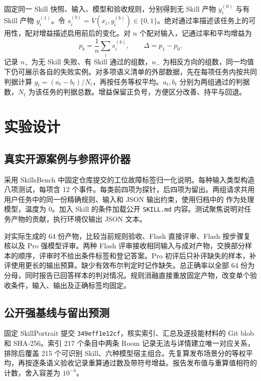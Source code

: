 \documentclass[final,5p,twocolumn,10pt]{elsarticle}
\newcommand{\code}[1]{\texttt{#1}}
\begin{document}
固定同一 Skill 快照、输入、模型和验收规则，分别得到无 Skill 产物 $y_i^{(0)}$ 与有 Skill 产物 $y_i^{(1)}$。令 $s_i^{(b)}=V(x_i,y_i^{(b)})\in\{0,1\}$。绝对通过率描述该任务上的可用性，配对增益描述启用前后的变化。对 $n$ 个配对输入，记通过率和平均增益为
\begin{equation}
 p_b=\frac{1}{n}\sum_i s_i^{(b)},\qquad \Delta=p_1-p_0.
 \label{eq:paired}
\end{equation}
记录 $n_+$ 为无 Skill 失败、有 Skill 通过的组数，$n_-$ 为相反方向的组数，同一均值下仍可展示各自的失败实例。对多项语义清单的外部数据，先在每项任务内按共同判据计算 $g_t=(a_t-b_t)/N_t$，再按任务等权平均。$a_t,b_t$ 分别为两组通过的判据数，$N_t$ 为该任务的判据总数。增益保留正负号，方便区分改善、持平与回退。

\section{实验设计}

\subsection{真实开源案例与参照评价器}

采用 SkillsBench 中固定仓库提交的工位故障标签归一化说明\cite{publicskill}。每种输入类型构造八项测试，每项含 12 个事件。每类前四项为探针，后四项为留出。两组请求共用用户任务中的同一份精确规则、输入和 JSON 输出约束，使用归档中的  作为处理模型，温度为 0。加入 Skill 的条件加载公开 \code{SKILL.md} 内容。测试聚焦说明对任务产物的贡献，执行环境仅输出 JSON 文本。

对实际生成的 64 份产物，比较当前规则验收、Flash 直接评审、Flash 按步骤复核以及 Pro 强模型评审。两种 Flash 评审接收相同输入与成对产物，交换部分样本的顺序，评审时不给出条件标签和登记答案。Pro 初评后只补评缺失的样本，补评使用更长的输出预算。缺少有效布尔判定时记作缺失。总正确率以全部 64 份为分母，同时报告已回答样本的判对情况。规则消融直接重放固定产物，改变单个验收条件，输入、输出及正确标签均固定。

\subsection{公开强基线与留出预测}

固定 SkillPortrait 提交 \code{349eff1e12cf}，核实索引、汇总及逐技能材料的 Git blob 和 SHA-256。索引 217 个条目中两条 Room 记录无法与详情建立唯一对应关系，排除后覆盖 215 个可识别 Skill、六种模型宿主组合。先复算发布场景分的等权平均，再按逐条语义验收记录重算通过数及带符号增益。报告发布值与重算值相符的计数，舍入容差为 $10^{-4}$。
\end{document}
